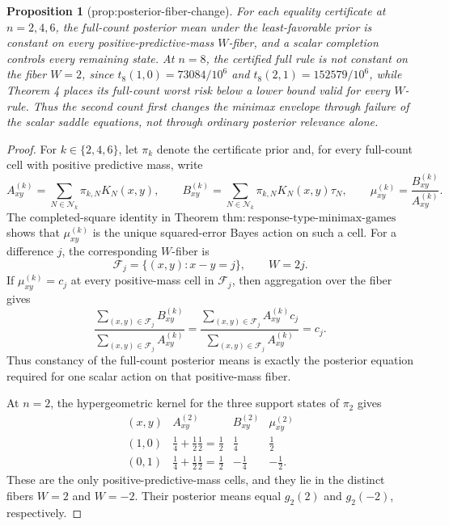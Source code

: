 \documentclass{article}
\newtheorem{proposition}{Proposition}
\begin{document}
\begin{proposition}[prop:posterior-fiber-change]\label{prop:posterior-fiber-change}
For each equality certificate at \(n=2,4,6\), the full-count posterior mean under the least-favorable prior is constant on every positive-predictive-mass \(W\)-fiber, and a scalar completion controls every remaining state. At \(n=8\), the certified full rule is not constant on the fiber \(W=2\), since \(t_8(1,0)=73084/10^6\) and \(t_8(2,1)=152579/10^6\), while Theorem 4 places its full-count worst risk below a lower bound valid for every \(W\)-rule. Thus the second count first changes the minimax envelope through failure of the scalar saddle equations, not through ordinary posterior relevance alone.
\end{proposition}
\begin{proof}
For \(k\in\{2,4,6\}\), let \(\pi_k\) denote the certificate prior and, for every full-count cell with positive predictive mass, write
\[
 A_{xy}^{(k)}=\sum_{N\in\mathcal N_k}\pi_{k,N}K_N(x,y),
 \qquad
 B_{xy}^{(k)}=\sum_{N\in\mathcal N_k}\pi_{k,N}K_N(x,y)\tau_N,
 \qquad
 \mu_{xy}^{(k)}=\frac{B_{xy}^{(k)}}{A_{xy}^{(k)}}.
\]
The completed-square identity in Theorem
\(\mathrm{thm{:}response\mbox{-}type\mbox{-}minimax\mbox{-}games}\)
shows that \(\mu_{xy}^{(k)}\) is the unique squared-error Bayes action on such a cell.  For a difference \(j\), the corresponding \(W\)-fiber is
\[
 \mathcal F_j=\{(x,y):x-y=j\},\qquad W=2j.
\]
If \(\mu_{xy}^{(k)}=c_j\) at every positive-mass cell in \(\mathcal F_j\), then aggregation over the fiber gives
\[
 \frac{\sum_{(x,y)\in\mathcal F_j}B_{xy}^{(k)}}
 {\sum_{(x,y)\in\mathcal F_j}A_{xy}^{(k)}}
 =
 \frac{\sum_{(x,y)\in\mathcal F_j}A_{xy}^{(k)}c_j}
 {\sum_{(x,y)\in\mathcal F_j}A_{xy}^{(k)}}
 =c_j.
\]
Thus constancy of the full-count posterior means is exactly the posterior equation required for one scalar action on that positive-mass fiber.

At \(n=2\), the hypergeometric kernel for the three support states of \(\pi_2\) gives
\[
\begin{array}{c|ccc}
(x,y)&A_{xy}^{(2)}&B_{xy}^{(2)}&\mu_{xy}^{(2)}\\ \hline
(1,0)&\frac14+\frac12\frac12=\frac12&\frac14&\frac12\\[2pt]
(0,1)&\frac14+\frac12\frac12=\frac12&-\frac14&-\frac12 .
\end{array}
\]
These are the only positive-predictive-mass cells, and they lie in the distinct fibers \(W=2\) and \(W=-2\).  Their posterior means equal \(g_2(2)\) and \(g_2(-2)\), respectively.


\end{proof}
\end{document}

